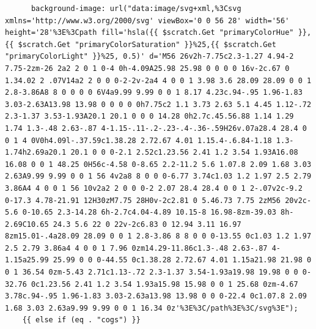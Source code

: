 \documentclass[11pt]{article}
\begin{document}
\begin{enumerate}
\begin{verbatim}
      background-image: url("data:image/svg+xml,%3Csvg xmlns='http://www.w3.org/2000/svg' viewBox='0 0 56 28' width='56' height='28'%3E%3Cpath fill='hsla({{ $scratch.Get "primaryColorHue" }},{{ $scratch.Get "primaryColorSaturation" }}%25,{{ $scratch.Get "primaryColorLight" }}%25, 0.5)' d='M56 26v2h-7.75c2.3-1.27 4.94-2 7.75-2zm-26 2a2 2 0 1 0-4 0h-4.09A25.98 25.98 0 0 0 0 16v-2c.67 0 1.34.02 2 .07V14a2 2 0 0 0-2-2v-2a4 4 0 0 1 3.98 3.6 28.09 28.09 0 0 1 2.8-3.86A8 8 0 0 0 0 6V4a9.99 9.99 0 0 1 8.17 4.23c.94-.95 1.96-1.83 3.03-2.63A13.98 13.98 0 0 0 0 0h7.75c2 1.1 3.73 2.63 5.1 4.45 1.12-.72 2.3-1.37 3.53-1.93A20.1 20.1 0 0 0 14.28 0h2.7c.45.56.88 1.14 1.29 1.74 1.3-.48 2.63-.87 4-1.15-.11-.2-.23-.4-.36-.59H26v.07a28.4 28.4 0 0 1 4 0V0h4.09l-.37.59c1.38.28 2.72.67 4.01 1.15.4-.6.84-1.18 1.3-1.74h2.69a20.1 20.1 0 0 0-2.1 2.52c1.23.56 2.41 1.2 3.54 1.93A16.08 16.08 0 0 1 48.25 0H56c-4.58 0-8.65 2.2-11.2 5.6 1.07.8 2.09 1.68 3.03 2.63A9.99 9.99 0 0 1 56 4v2a8 8 0 0 0-6.77 3.74c1.03 1.2 1.97 2.5 2.79 3.86A4 4 0 0 1 56 10v2a2 2 0 0 0-2 2.07 28.4 28.4 0 0 1 2-.07v2c-9.2 0-17.3 4.78-21.91 12H30zM7.75 28H0v-2c2.81 0 5.46.73 7.75 2zM56 20v2c-5.6 0-10.65 2.3-14.28 6h-2.7c4.04-4.89 10.15-8 16.98-8zm-39.03 8h-2.69C10.65 24.3 5.6 22 0 22v-2c6.83 0 12.94 3.11 16.97 8zm15.01-.4a28.09 28.09 0 0 1 2.8-3.86 8 8 0 0 0-13.55 0c1.03 1.2 1.97 2.5 2.79 3.86a4 4 0 0 1 7.96 0zm14.29-11.86c1.3-.48 2.63-.87 4-1.15a25.99 25.99 0 0 0-44.55 0c1.38.28 2.72.67 4.01 1.15a21.98 21.98 0 0 1 36.54 0zm-5.43 2.71c1.13-.72 2.3-1.37 3.54-1.93a19.98 19.98 0 0 0-32.76 0c1.23.56 2.41 1.2 3.54 1.93a15.98 15.98 0 0 1 25.68 0zm-4.67 3.78c.94-.95 1.96-1.83 3.03-2.63a13.98 13.98 0 0 0-22.4 0c1.07.8 2.09 1.68 3.03 2.63a9.99 9.99 0 0 1 16.34 0z'%3E%3C/path%3E%3C/svg%3E");
    {{ else if (eq . "cogs") }}

\end{verbatim}
\end{enumerate}
\end{document}
